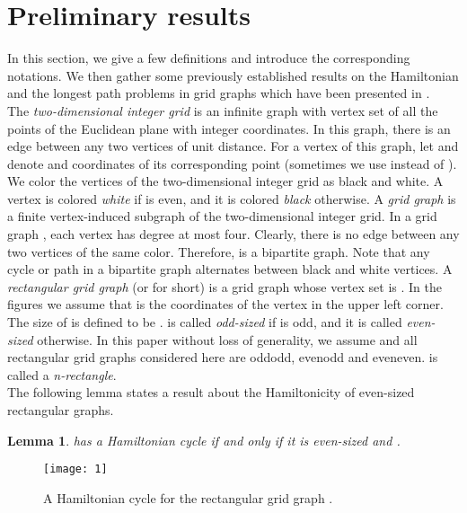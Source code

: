 \documentclass[preprint,12pt]{elsarticle}
\newtheorem{lem}{Lemma}[section]
\begin{document}
\section{Preliminary results}
In this section, we give a few definitions and introduce the
corresponding notations. We then gather some previously established
results on the Hamiltonian and the longest path problems
in grid graphs which have been presented in \cite{CST:AFAFCHPIM, IPS:HPIGG, FAA:ALAFFLPIRGG}.\\
The \textit{two-dimensional integer grid}  is an infinite
graph with vertex set of all the points of the Euclidean plane with
integer coordinates. In this graph, there is an edge between any two
vertices of unit distance. For a vertex  of this graph, let
 and  denote  and  coordinates of its
corresponding point (sometimes we use  instead of ).
We color the vertices of the two-dimensional integer grid as black
and white. A vertex  is colored \textit{white} if
 is even, and it is colored
\textit{black} otherwise. A \textit{grid graph}  is a finite
vertex-induced subgraph of the two-dimensional integer grid. In a
grid graph , each vertex has degree at most four. Clearly,
there is no edge between any two vertices of the same color.
Therefore,  is a bipartite graph. Note that any cycle or path
in a bipartite graph alternates between black and white vertices. A
\textit{rectangular grid graph}  (or  for short) is a
grid graph whose vertex set is . In the figures we
assume that  is the coordinates of the vertex in the upper
left corner. The size of  is defined to be .  is
called \textit{odd-sized} if  is odd, and it is called
\textit{even-sized} otherwise. In this paper without loss of
generality, we assume  and all rectangular grid graphs
considered here are oddodd, evenodd and
eveneven.  is called a \textit{n-rectangle}.\\
The following lemma states a result about the Hamiltonicity of
even-sized rectangular graphs.
\begin{lem}
\label{Lemma:1} \cite{CST:AFAFCHPIM}  has a Hamiltonian
cycle if and only if it is even-sized and .
\end{lem}

\begin{figure}[tb]
  \centering
  \texttt{[image: 1]}
  \caption[]{\small A Hamiltonian cycle for the rectangular grid graph .}
\label{fig:hamcycle}
\end{figure}
\end{document}
